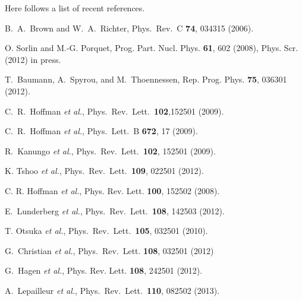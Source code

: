 \documentclass[prc]{revtex4}
\begin{document}
Here follows a list of recent references.


\begin{thebibliography}{99}
 B.~A.~Brown and W.~A.~Richter, Phys.~Rev.~C {\bf 74},  034315 (2006).


 O. Sorlin and M.-G. Porquet, Prog. Part. Nucl. Phys. \textbf{61},  602 (2008), Phys. Scr. (2012) in press.

 T.~Baumann, A.~Spyrou, and M.~Thoennessen, Rep. Prog. Phys. {\bf 75},  036301  (2012).


 C.~R.~Hoffman {\em et al.}, Phys.~Rev.~Lett.~{\bf 102},152501  (2009). 

 C.~R.~Hoffman {\em et al.}, Phys.~Lett.~B {\bf 672}, 17 (2009).

 R.~Kanungo {\em et al.}, Phys.~Rev.~Lett.~{\bf 102}, 152501 (2009).




 K. Tshoo  {\em et al.}, Phys.~Rev.~Lett.~{\bf 109}, 022501 (2012).  

 C. R. Hoffman {\em et al.}, Phys. Rev. Lett. {\bf 100}, 152502 (2008).

 E.~Lunderberg {\it et al.}, Phys.~Rev.~Lett.~{\bf 108}, 142503 (2012). 

 T. Otsuka {\it et al.}, Phys.~Rev.~Lett.~{\bf 105}, 032501 (2010). 


 G.~Christian {\em et al.}, Phys.~Rev.~Lett. {\bf 108}, 032501 (2012)



 G.~Hagen {\em et al.}, Phys. Rev. Lett. {\bf 108}, 242501 (2012).

 A.~Lepailleur {\it et al.}, Phys.~Rev.~Lett.~{\bf 110}, 082502 (2013). 

\end{thebibliography}
\end{document}
